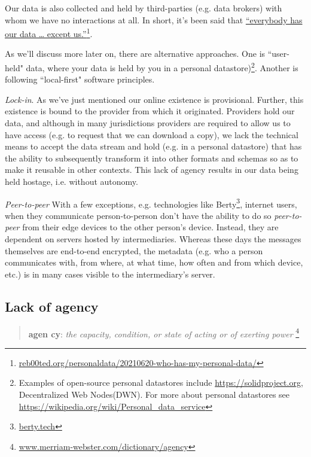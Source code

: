 \documentclass[11pt, oneside]{article}   	%
\newcommand{\hyperfootnote}[1][]{\def\ArgI{{#1}}\hyperfootnoteRelay}
\newcommand\hyperfootnoteRelay[2][]{\href{#1#2}{\ArgI}\footnote{\href{#1#2}{#2}}}
\begin{document}
Our data is also collected and held by third-parties (e.g. data brokers) with whom we have no interactions at all. In short, it's been said that \hyperfootnote[“everybody has our data … except us.”][https://]{reb00ted.org/personaldata/20210620-who-has-my-personal-data/}. 

As we'll discuss more later on, there are alternative approaches. One is ``user-held" data\cite{Jurcys2021}, where your data is held by you in a personal datastore)\footnote{Examples of open-source personal datastores include \url{https://solidproject.org}, Decentralized Web Nodes(DWN). For more about personal datastores see \url{https://wikipedia.org/wiki/Personal\_data\_service}}. Another is following ``local-first" software principles.\cite{Kleppmann2019}

\emph{Lock-in}. As we've just mentioned our online existence is provisional. Further, this existence is bound to the provider from which it originated. Providers hold our data, and although in many jurisdictions providers are required to allow us to have access (e.g. to request that we can download a copy), we lack the technical means to accept the data stream and hold (e.g. in a personal datastore) that has the ability to subsequently transform it into other formats and schemas so as to make it reusable in other contexts. This lack of agency results in our data being held hostage, i.e. without autonomy. 

\emph{Peer-to-peer} With a few exceptions, e.g. technologies like Berty\hyperfootnote[][https://]{berty.tech}, internet users, when they communicate person-to-person don't have the ability to do so \emph{peer-to-peer} from their edge devices to the other person's device. Instead, they are dependent on servers hosted by intermediaries. Whereas these days the messages themselves are end-to-end encrypted, the metadata (e.g. who a person communicates with, from where, at what time, how often and from which device, etc.) is in many cases visible to the intermediary's server. 

\subsection{Lack of agency}

\begin{quote}
\textbf{a\hspace{0.5mm}\tiny {}\normalsize \hspace{0.5mm}gen \tiny {} \normalsize cy}: \emph{the capacity, condition, or state of acting or of exerting power} \hyperfootnote[][https://]{www.merriam-webster.com/dictionary/agency}
\end{quote}
\end{document}
